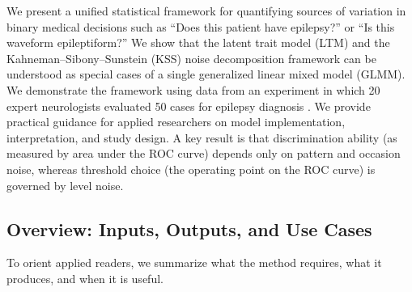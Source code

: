 We present a unified statistical framework for quantifying sources of variation in binary medical decisions such as “Does this patient have epilepsy?” or “Is this waveform epileptiform?” We show that the latent trait model (LTM) and the Kahneman--Sibony--Sunstein (KSS) noise decomposition framework can be understood as special cases of a single generalized linear mixed model (GLMM). We demonstrate the framework using data from an experiment in which 20 expert neurologists evaluated 50 cases for epilepsy diagnosis \cite{nascimentonoise}. We provide practical guidance for applied researchers on model implementation, interpretation, and study design. A key result is that discrimination ability (as measured by area under the ROC curve) depends only on pattern and occasion noise, whereas threshold choice (the operating point on the ROC curve) is governed by level noise.

\subsection*{Overview: Inputs, Outputs, and Use Cases}

To orient applied readers, we summarize what the method requires, what it produces, and when it is useful.


